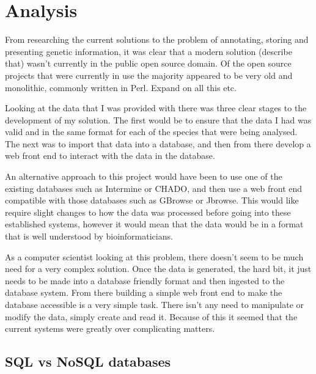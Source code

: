 \section{Analysis}

From researching the current solutions to the problem of annotating, storing and presenting genetic information, it was clear that a modern solution (describe that) wasn't currently in the public open source domain. Of the open source projects that were currently in use the majority appeared to be very old and monolithic, commonly written in Perl. Expand on all this etc.


Looking at the data that I was provided with there was three clear stages to the development of my solution. The first would be to ensure that the data I had was valid and in the same format for each of the species that were being analysed. The next was to import that data into a database, and then from there develop a web front end to interact with the data in the database. 


An alternative approach to this project would have been to use one of the existing databases such as Intermine or CHADO, and then use a web front end compatible with those databases such as GBrowse or Jbrowse. This would like require slight changes to how the data was processed before going into these established systems, however it would mean that the data would be in a format that is well understood by bioinformaticians. 


As a computer scientist looking at this problem, there doesn't seem to be much need for a very complex solution. Once the data is generated, the hard bit, it just needs to be made into a database friendly format and then ingested to the database system. From there building a simple web front end to make the database accessible is a very simple task. There isn't any need to manipulate or modify the data, simply create and read it. Because of this it seemed that the current systems were greatly over complicating matters. 

  \subsection{SQL vs NoSQL databases}

